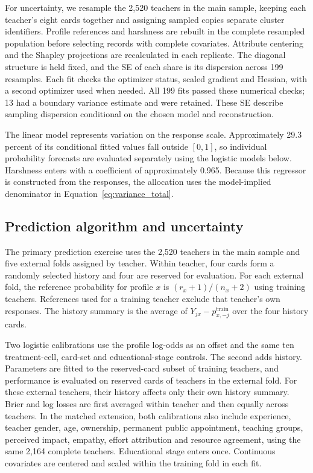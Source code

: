 For uncertainty, we resample the 2,520 teachers in the main sample, keeping each teacher's eight cards together and assigning sampled copies separate cluster identifiers. Profile references and harshness are rebuilt in the complete resampled population before selecting records with complete covariates. Attribute centering and the Shapley projections are recalculated in each replicate. The diagonal structure is held fixed, and the SE of each share is its dispersion across 199 resamples. Each fit checks the optimizer status, scaled gradient and Hessian, with a second optimizer used when needed. All 199 fits passed these numerical checks; 13 had a boundary variance estimate and were retained. These SE describe sampling dispersion conditional on the chosen model and reconstruction.

The linear model represents variation on the response scale. Approximately 29.3 percent of its conditional fitted values fall outside $[0,1]$, so individual probability forecasts are evaluated separately using the logistic models below. Harshness enters with a coefficient of approximately 0.965. Because this regressor is constructed from the responses, the allocation uses the model-implied denominator in Equation~\ref{eq:variance_total}.

\subsection{Prediction algorithm and uncertainty}
The primary prediction exercise uses the 2,520 teachers in the main sample and five external folds assigned by teacher. Within teacher, four cards form a randomly selected history and four are reserved for evaluation. For each external fold, the reference probability for profile $x$ is $(r_x+1)/(n_x+2)$ using training teachers. References used for a training teacher exclude that teacher's own responses. The history summary is the average of $Y_{jx}-p_{x,-j}^{\mathrm{train}}$ over the four history cards.

Two logistic calibrations use the profile log-odds as an offset and the same ten treatment-cell, card-set and educational-stage controls. The second adds history. Parameters are fitted to the reserved-card subset of training teachers, and performance is evaluated on reserved cards of teachers in the external fold. For these external teachers, their history affects only their own history summary. Brier and log losses are first averaged within teacher and then equally across teachers. In the matched extension, both calibrations also include experience, teacher gender, age, ownership, permanent public appointment, teaching groups, perceived impact, empathy, effort attribution and resource agreement, using the same 2,164 complete teachers. Educational stage enters once. Continuous covariates are centered and scaled within the training fold in each fit.

